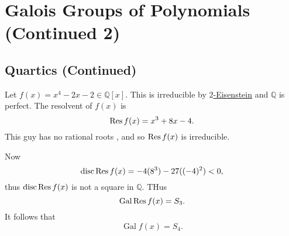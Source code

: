 \documentclass[notoc,notitlepage,nobib]{tufte-book}
\DeclareMathOperator{\disc}{disc}
\DeclareMathOperator{\Gal}{Gal}
\begin{document}
\section{Galois Groups of Polynomials (Continued 2)}%
\label{sec:galois_groups_of_polynomials_continued_2}

\subsection{Quartics (Continued)}%
\label{sub:quartics_continued}

\begin{eg}
  Let $f(x) = x^4 - 2x - 2 \in \mathbb{Q}[x]$. This is irreducible by
  \hyperref[propo:eisenstein_s_criterion]{$2$-Eisenstein} and $\mathbb{Q}$ is
  perfect. The resolvent of $f(x)$ is
  \begin{equation*}
    \operatorname{Res} f(x) = x^3 + 8x - 4.
  \end{equation*}
  This guy has no rational roots , and so $\operatorname{Res} f(x)$ is
  irreducible.

  Now
  \begin{equation*}
    \disc \Res f(x) = -4(8^3) - 27((-4)^2) < 0,
  \end{equation*}
  thus $\disc \Res f(x)$ is not a square in $\mathbb{Q}$. THus
  \begin{equation*}
    \Gal \Res f(x) = S_3.
  \end{equation*}
  It follows that
  \begin{equation*}
    \Gal f(x) = S_4.
  \end{equation*}
\end{eg}
\end{document}
